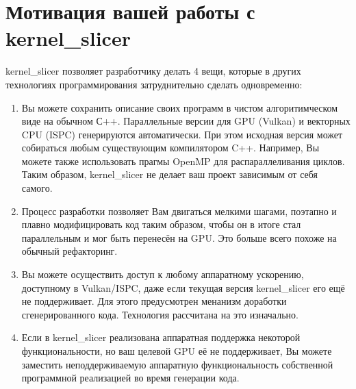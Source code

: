 \documentclass[11pt,fleqn,english,russian]{report} %
\begin{document}

\section{Мотивация вашей работы с kernel\_slicer }

kernel\_slicer позволяет разработчику делать 4 вещи, которые в других технологиях программирования затруднительно сделать одновременно:

\begin{enumerate}

\item Вы можете сохранить описание своих программ в чистом алгоритимческом виде на обычном С++. Параллельные версии для GPU (Vulkan) и векторных CPU (ISPC) генерируются автоматически. При этом исходная версия может собираться любым существующим компилятором C++. Например, Вы можете также использовать прагмы OpenMP для распараллеливания циклов. Таким образом, kernel\_slicer не делает ваш проект зависимым от себя самого.

\item Процесс разработки позволяет Вам двигаться мелкими шагами, поэтапно и плавно модифицировать код таким образом, чтобы он в итоге стал параллельным и мог быть перенесён на GPU. Это больше всего похоже на обычный рефакторинг.

\item Вы можете осуществить доступ к любому аппаратному ускорению, доступному в Vulkan/ISPC, даже если текущая версия kernel\_slicer его ещё не поддерживает. Для этого предусмотрен менанизм доработки сгенерированного кода. Технология рассчитана на это изначально.

\item Если в kernel\_slicer реализована аппаратная поддержка некоторой функциональности, но ваш целевой GPU её не поддерживает, Вы можете заместить неподдерживаемую аппаратную функциональность собственной программной реализацией во время генерации кода.
\end{enumerate}
\end{document}

